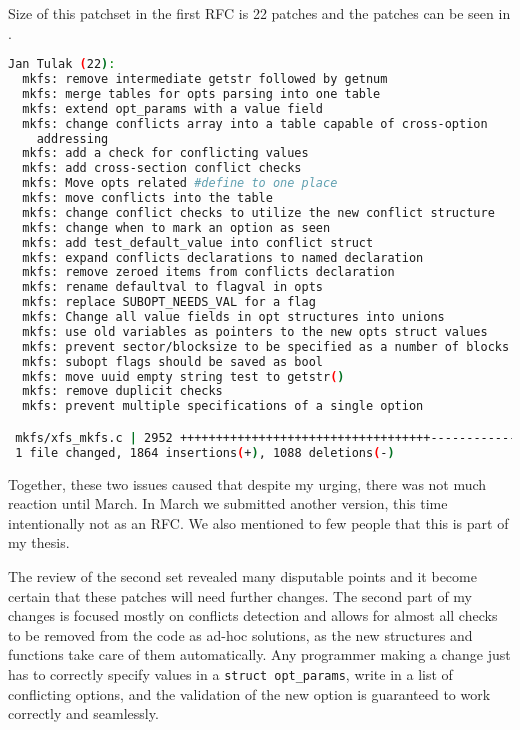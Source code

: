 Size of this patchset in the first RFC is 22 patches and the patches can be
seen in .
\begin{lstlisting}[frame=none, basicstyle=\footnotesize\ttfamily,
language=Bash, numbers=none, numberstyle=\tiny\color{black},caption= {Git
statistics for the second patchset~\cite{secondSetRFC}.},
label={lst:refactoring:secondSet}]
Jan Tulak (22):
  mkfs: remove intermediate getstr followed by getnum
  mkfs: merge tables for opts parsing into one table
  mkfs: extend opt_params with a value field
  mkfs: change conflicts array into a table capable of cross-option
    addressing
  mkfs: add a check for conflicting values
  mkfs: add cross-section conflict checks
  mkfs: Move opts related #define to one place
  mkfs: move conflicts into the table
  mkfs: change conflict checks to utilize the new conflict structure
  mkfs: change when to mark an option as seen
  mkfs: add test_default_value into conflict struct
  mkfs: expand conflicts declarations to named declaration
  mkfs: remove zeroed items from conflicts declaration
  mkfs: rename defaultval to flagval in opts
  mkfs: replace SUBOPT_NEEDS_VAL for a flag
  mkfs: Change all value fields in opt structures into unions
  mkfs: use old variables as pointers to the new opts struct values
  mkfs: prevent sector/blocksize to be specified as a number of blocks
  mkfs: subopt flags should be saved as bool
  mkfs: move uuid empty string test to getstr()
  mkfs: remove duplicit checks
  mkfs: prevent multiple specifications of a single option

 mkfs/xfs_mkfs.c | 2952 +++++++++++++++++++++++++++++++++++--------------------
 1 file changed, 1864 insertions(+), 1088 deletions(-)

\end{lstlisting}

Together, these two issues caused that despite my urging, there was not much
reaction until March. In March we submitted another version, this time
intentionally not as an RFC. We also mentioned to few people that this is
part of my thesis.

The review of the second set revealed many disputable points and it become
certain that these patches will need further changes. The second part of
my changes is focused mostly on conflicts detection and allows for almost
all checks to be removed from the code as ad-hoc solutions, as the new
structures and functions take care of them automatically. Any programmer
making a change just has to correctly specify values in a {\tt struct
opt\_params}, write in a list of conflicting options, and the validation of
the new option is guaranteed to work correctly and seamlessly.

